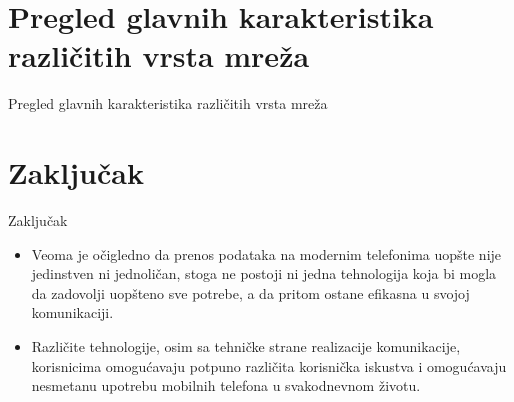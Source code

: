 \documentclass{beamer}
\begin{document}
\section{Pregled glavnih karakteristika različitih vrsta mreža}
\begin{frame}{Pregled glavnih karakteristika različitih vrsta mreža}
    \begin{center}
  \end{center}
\end{frame} 

\section{Zaključak}
\begin{frame}{Zaključak}
	\begin{itemize}
	    \item Veoma je očigledno da prenos podataka na modernim telefonima uopšte nije jedinstven ni jednoličan, stoga ne postoji ni jedna tehnologija koja bi mogla da zadovolji uopšteno sve potrebe, a da pritom ostane efikasna u svojoj komunikaciji.
        \item Različite tehnologije, osim sa tehničke strane realizacije komunikacije, korisnicima omogućavaju potpuno različita korisnička iskustva i omogućavaju nesmetanu upotrebu mobilnih telefona u svakodnevnom životu.
	\end{itemize}
\end{frame}
\end{document}
